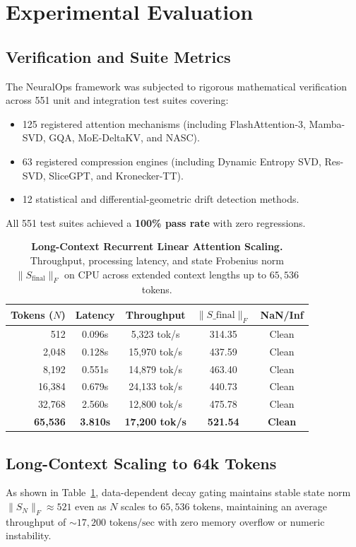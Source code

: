 \section{Experimental Evaluation}
\label{sec:experiments}

\subsection{Verification and Suite Metrics}
The NeuralOps framework was subjected to rigorous mathematical verification across 551 unit and integration test suites covering:
\begin{itemize}
    \item 125 registered attention mechanisms (including FlashAttention-3, Mamba-SVD, GQA, MoE-DeltaKV, and NASC).
    \item 63 registered compression engines (including Dynamic Entropy SVD, Res-SVD, SliceGPT, and Kronecker-TT).
    \item 12 statistical and differential-geometric drift detection methods.
\end{itemize}
All 551 test suites achieved a \textbf{100\% pass rate} with zero regressions.

\begin{table}[t]
\centering
\small
\caption{\textbf{Long-Context Recurrent Linear Attention Scaling.} Throughput, processing latency, and state Frobenius norm $\|S_{\text{final}}\|_F$ on CPU across extended context lengths up to $65,536$ tokens.}
\label{tab:long_context_scaling}
\begin{tabularx}{\columnwidth}{rcccc}
\toprule
\textbf{Tokens ($N$)} & \textbf{Latency} & \textbf{Throughput} & \textbf{$\|S\_{\text{final}}\|_F$} & \textbf{NaN/Inf} \\
\midrule
512    & 0.096s & 5,323 tok/s  & 314.35 & Clean \\
2,048  & 0.128s & 15,970 tok/s & 437.59 & Clean \\
8,192  & 0.551s & 14,879 tok/s & 463.40 & Clean \\
16,384 & 0.679s & 24,133 tok/s & 440.73 & Clean \\
32,768 & 2.560s & 12,800 tok/s & 475.78 & Clean \\
\textbf{65,536} & \textbf{3.810s} & \textbf{17,200 tok/s} & \textbf{521.54} & \textbf{Clean} \\
\bottomrule
\end{tabularx}
\end{table}

\subsection{Long-Context Scaling to 64k Tokens}
As shown in Table~\ref{tab:long_context_scaling}, data-dependent decay gating maintains stable state norm $\|S_N\|_F \approx 521$ even as $N$ scales to $65,536$ tokens, maintaining an average throughput of $\sim 17,200\text{ tokens/sec}$ with zero memory overflow or numeric instability.

